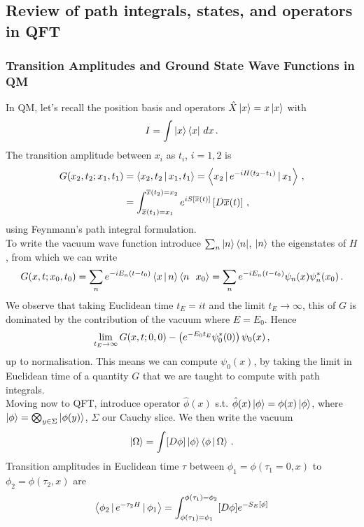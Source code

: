 \documentclass{article}
\begin{document}
\subsection{Review of path integrals, states, and operators in QFT}
\subsubsection{Transition Amplitudes and Ground State Wave Functions in QM}
In QM, let's recall the position basis and operators $\hat{X} \ket{x} = x \ket{x}$ with 
\[
I = \int \ket{x} \bra{x} \, dx \, .
\]
The transition amplitude between $x_i$ as $t_i$, $i=1,2$ is 
\begin{align*}
G(x_2, t_2; x_1, t_1) &= \left\langle x_2, t_2 \, | \, x_1, t_1 \right\rangle = \left\langle x_2 \, | \, e^{-iH(t_2-t_1)} \, | \, x_1 \right\rangle \, , \\
&= \int_{\overline{x}(t_1)=x_1}^{\overline{x}(t_2) = x_2} e^{iS[\overline{x}(t)]} \left[ D \overline{x}(t) \right] \, , 
\end{align*}
using Feynmann's path integral formulation. \\
To write the vacuum wave function introduce $\sum_n \ket{n} \bra{n}$, $\ket{n}$ the eigenstates of $H$, from which we can write 
\[
G(x,t; x_0, t_0) = \sum_n e^{-iE_n(t-t_0)} \left\langle x \, | \, n \right\rangle \left\langle n \, \ \, x_0 \right\rangle = \sum_n e^{-iE_n(t-t_0)}  \psi_n(x) \psi_n^\ast (x_0) \, .
\] 
We observe that taking Euclidean time $t_E = it$ and the limit $t_E \to \infty$, this of $G$ is dominated by the contribution of the vacuum where $E=E_0$. Hence 
\[
\lim_{t_E \to \infty} G(x,t; 0,0) - \left( e^{-E_0 t_E}\psi_0^\ast(0) \right) \psi_0(x) \, ,
\]
up to normalisation. This means we can compute $\psi_0(x)$, by taking the limit in Euclidean time of a quantity $G$ that we are taught to compute with path integrals. \\
Moving now to QFT, introduce operator $\hat{\phi}(x)$ s.t. $\hat{\phi}(x) \ket{\phi} = \phi(x) \ket{\phi}$, where $\ket{\phi} = \bigotimes_{y \in \Sigma} \ket{\phi(y)}$, $\Sigma$ our Cauchy slice. We then write the vacuum 
\[
\ket{\Omega} = \int [D\phi] \ket{\phi} \left\langle \phi \, | \, \Omega \right\rangle \, .
\]
Transition amplitudes in Euclidean time $\tau$ between $\phi_1 = \phi(\tau_1=0, x)$ to $\phi_2=\phi(\tau_2, x)$ are
\begin{align*}
	\left\langle \phi_2 \, | \, e^{-\tau_2 H} \, | \, \phi_1 \right\rangle = \int_{\phi(\tau_1) = \phi_1}^{\phi(\tau_1) = \phi_2} [D\phi] e^{-S_E[\phi]}
\end{align*}


\end{document}
